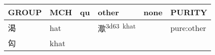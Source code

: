 \documentclass[14pt,a4paper]{scrartcl}
\begin{document}
\begin{longtable}[c]{@{}llllll@{}}
\toprule
\begin{minipage}[b]{0.14\columnwidth}\raggedright\strut
GROUP
\strut\end{minipage} &
\begin{minipage}[b]{0.14\columnwidth}\raggedright\strut
MCH
\strut\end{minipage} &
\begin{minipage}[b]{0.14\columnwidth}\raggedright\strut
qu
\strut\end{minipage} &
\begin{minipage}[b]{0.14\columnwidth}\raggedright\strut
other
\strut\end{minipage} &
\begin{minipage}[b]{0.14\columnwidth}\raggedright\strut
none
\strut\end{minipage} &
\begin{minipage}[b]{0.14\columnwidth}\raggedright\strut
PURITY
\strut\end{minipage}\tabularnewline
\midrule
\endhead
\begin{minipage}[t]{0.14\columnwidth}\raggedright\strut
渴
\strut\end{minipage} &
\begin{minipage}[t]{0.14\columnwidth}\raggedright\strut
hat
\strut\end{minipage} &
\begin{minipage}[t]{0.14\columnwidth}\raggedright\strut
\strut\end{minipage} &
\begin{minipage}[t]{0.14\columnwidth}\raggedright\strut
㵣\textsuperscript{3d63~khat}
\strut\end{minipage} &
\begin{minipage}[t]{0.14\columnwidth}\raggedright\strut
\strut\end{minipage} &
\begin{minipage}[t]{0.14\columnwidth}\raggedright\strut
pure:other
\strut\end{minipage}\tabularnewline
\begin{minipage}[t]{0.14\columnwidth}\raggedright\strut
匃
\strut\end{minipage} &
\begin{minipage}[t]{0.14\columnwidth}\raggedright\strut
khat
\strut\end{minipage} &
\begin{minipage}[t]{0.14\columnwidth}\raggedright\strut
\strut\end{minipage} &

\end{longtable}
\end{document}
